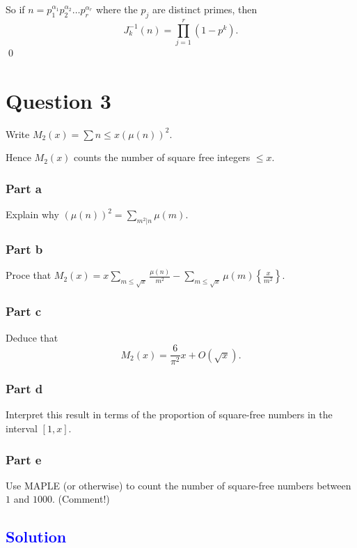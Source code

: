 \documentclass{unswmaths}
\begin{document}
So if $ n = p_1^{\alpha_1} p_2^{\alpha_2} \ldots p_r^{\alpha_r} $ where the $ p_j $ are distinct primes, then
$$
	J_{k}^{-1}(n) = \prod_{j = 1}^{r} \left( 1 - p^k \right).
$$
\qed

\hrulefill

\section*{Question 3}

Write $ M_2(x) = \sum{ n \leq x } (\mu(n))^2 $.

Hence $ M_2(x) $ counts the number of square free integers $ \leq x $.

\subsubsection*{Part a}
Explain why $ (\mu(n))^2 = \sum_{m^2 | n} \mu(m) $.

\subsubsection*{Part b}
Proce that $ M_2(x) = x \sum_{m \leq \sqrt{x}} \frac{\mu(n)}{m^2} - \sum_{m \leq \sqrt{x}} \mu(m) \left\{ \frac{x}{m^2} \right\} $.

\subsubsection*{Part c}
Deduce that 
$$
	M_2(x) = \frac{6}{\pi^2}x + O(\sqrt{x}).
$$

\subsubsection*{Part d}
Interpret this result in terms of the proportion of square-free numbers
in the interval $[ 1, x] $.
\subsubsection*{Part e}
Use MAPLE (or otherwise) to count the number of square-free numbers between $ 1 $ and $ 1000 $. (Comment!)

\hrulefill

\subsection*{\textcolor{blue}{Solution}}
\end{document}
